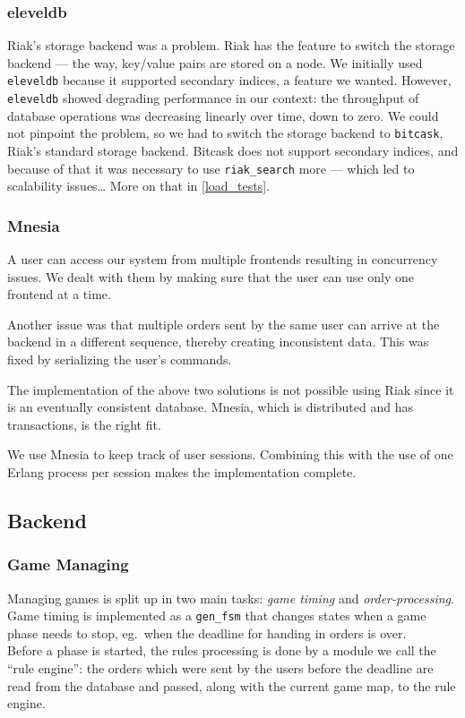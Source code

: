 \documentclass[11pt,a4paper]{report}
\begin{document}
\subsubsection{eleveldb}
Riak's storage backend was a problem. Riak has the feature to switch the
storage backend --- the way, key/value pairs are stored on a node.
We initially used {\tt eleveldb} because it supported secondary indices, a
feature we wanted. However, {\tt eleveldb} showed degrading performance
in our context: the throughput of database operations was decreasing linearly
over time, down to zero. We could not pinpoint the problem, so we had to switch
the storage backend to {\tt bitcask}, Riak's standard storage backend.
Bitcask does not support secondary indices, and because of that it was
necessary to use {\tt riak\_search} more --- which led to scalability
issues\ldots
More on that in \ref{load_tests}.


\subsubsection{Mnesia}
\label{sec:mnesia}
A user can access our system from multiple frontends resulting in
concurrency issues. We dealt with them by making sure that the user
can use only one frontend at a time.

Another issue was that multiple orders sent by the same user can arrive at the
backend in a different sequence, thereby creating inconsistent data. This was
fixed by serializing the user's commands.

The implementation of the above two solutions is not possible using Riak since
it is an eventually consistent database. Mnesia, which is distributed and has
transactions, is the right fit.

We use Mnesia to keep track of user sessions. Combining this with
the use of one Erlang process per session makes the implementation complete.


\subsection{Backend}
\subsubsection{Game Managing}
Managing games is split up in two main tasks: {\em game timing\/} and
{\em order-processing}. \\
Game timing is implemented as a {\tt gen\_fsm} that changes states when a game
phase needs to stop, eg.\ when the deadline for handing in orders is over.\\
Before a phase is started, the rules processing is done by a module we call
the ``rule engine'': the orders which were sent by the users before the
deadline are read from the database and passed, along with the current game
map, to the rule engine.
\end{document}
